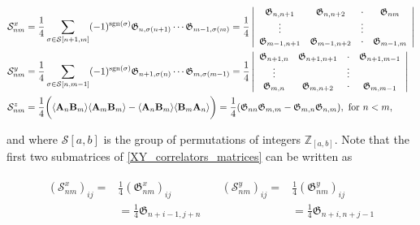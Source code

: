 \documentclass{homework}
\begin{document}
\begin{equation}
    \begin{split}
        &\mathcal{S}_{nm}^x = \frac{1}{4} \sum_{\sigma \in \mathcal{S}[n+1,m]} (-1)^{\textnormal{sgn}(\sigma)} \mathfrak{G}_{n, \sigma(n+1)} \cdots \mathfrak{G}_{m-1, \sigma(m)} = \frac{1}{4} \left| \begin{array}{cccc}
          \mathfrak{G}_{n, n+1} & \mathfrak{G}_{n, n+2} & \cdot & \mathfrak{G}_{nm}  \\
          \vdots & & \vdots\\
          \mathfrak{G}_{m-1, n+1} & \mathfrak{G}_{m-1, n+2} & \cdot & \mathfrak{G}_{m-1, m}  \\
        \end{array} \right| \\
        &\mathcal{S}_{nm}^y = \frac{1}{4} \sum_{\sigma \in \mathcal{S}[n,m-1]} (-1)^{\textnormal{sgn}(\sigma)} \mathfrak{G}_{n+1, \sigma(n)} \cdots \mathfrak{G}_{m, \sigma(m-1)} = \frac{1}{4} \left| \begin{array}{cccc}
          \mathfrak{G}_{n+1, n} & \mathfrak{G}_{n+1, n+1} & \cdot & \mathfrak{G}_{n+1,m-1}  \\
          \vdots & & \vdots\\
          \mathfrak{G}_{m, n} & \mathfrak{G}_{m, n+2} & \cdot & \mathfrak{G}_{m, m-1}  \\
        \end{array} \right| \\
         &\mathcal{S}_{nm}^z = \frac{1}{4} \bigg(\langle {\bf A}_n {\bf B}_m\rangle \langle {\bf A}_m {\bf B}_m \rangle - \langle {\bf A}_n {\bf B}_m \rangle \langle {\bf B}_m {\bf A}_n \rangle \bigg) = \frac{1}{4} (\mathfrak{G}_{nn} \mathfrak{G}_{m,m} - \mathfrak{G}_{m, n} \mathfrak{G}_{n,m}), \textnormal{ for } n<m,
         \label{XY_correlators_matrices}
    \end{split}
\end{equation}

and where $\mathcal{S}[a,b]$ is the group of permutations of integers $\mathds{Z}_{[a,b]}$. Note that the first two submatrices of \cref{XY_correlators_matrices} can be written as 

\begin{equation*}
    \begin{array}{cc}
     \begin{split}
         (\mathcal{S}_{nm}^x)_{ij} =& \frac{1}{4} (\mathfrak{G}_{nm}^x)_{ij} \\
         &= \frac{1}{4} \mathfrak{G}_{n+i-1,j+n}
     \end{split} \quad 
     \begin{split}
         (\mathcal{S}_{nm}^y)_{ij} =& \frac{1}{4} (\mathfrak{G}_{nm}^y)_{ij} \\
         &= \frac{1}{4} \mathfrak{G}_{n+i, n+j-1}
     \end{split} 
\end{array}
\end{equation*}
\end{document}
